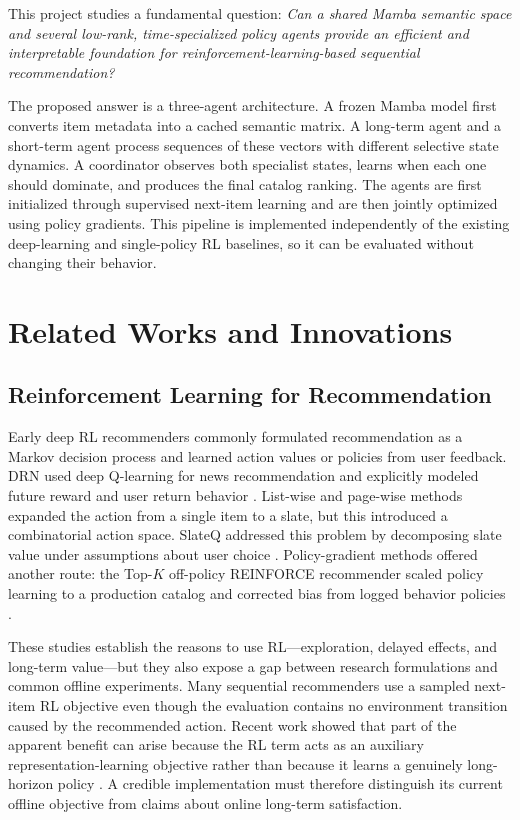 \documentclass[11pt,a4paper]{article}
\begin{document}
This project studies a fundamental question: \emph{Can a shared Mamba semantic space and several low-rank, time-specialized policy agents provide an efficient and interpretable foundation for reinforcement-learning-based sequential recommendation?}

The proposed answer is a three-agent architecture. A frozen Mamba model first converts item metadata into a cached semantic matrix. A long-term agent and a short-term agent process sequences of these vectors with different selective state dynamics. A coordinator observes both specialist states, learns when each one should dominate, and produces the final catalog ranking. The agents are first initialized through supervised next-item learning and are then jointly optimized using policy gradients. This pipeline is implemented independently of the existing deep-learning and single-policy RL baselines, so it can be evaluated without changing their behavior.

\section{Related Works and Innovations}

\subsection{Reinforcement Learning for Recommendation}

Early deep RL recommenders commonly formulated recommendation as a Markov decision process and learned action values or policies from user feedback. DRN used deep Q-learning for news recommendation and explicitly modeled future reward and user return behavior \cite{DRN}. List-wise and page-wise methods expanded the action from a single item to a slate, but this introduced a combinatorial action space. SlateQ addressed this problem by decomposing slate value under assumptions about user choice \cite{SLATEQ}. Policy-gradient methods offered another route: the Top-$K$ off-policy REINFORCE recommender scaled policy learning to a production catalog and corrected bias from logged behavior policies \cite{TOPKREINFORCE}.

These studies establish the reasons to use RL---exploration, delayed effects, and long-term value---but they also expose a gap between research formulations and common offline experiments. Many sequential recommenders use a sampled next-item RL objective even though the evaluation contains no environment transition caused by the recommended action. Recent work showed that part of the apparent benefit can arise because the RL term acts as an auxiliary representation-learning objective rather than because it learns a genuinely long-horizon policy \cite{UNEXPECTEDRL}. A credible implementation must therefore distinguish its current offline objective from claims about online long-term satisfaction.
\end{document}
